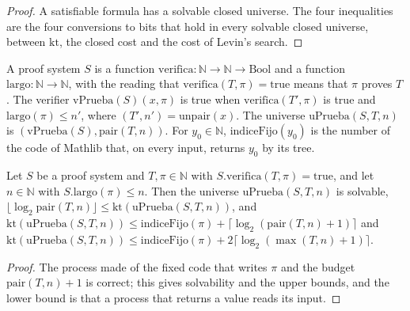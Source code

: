 \begin{proof}
  \leanok
  A satisfiable formula has a solvable closed universe. The four inequalities are the four
  conversions to bits that hold in every solvable closed universe, between $\mathrm{kt}$, the closed
  cost and the cost of Levin's search.
\end{proof}

\begin{definition}
  \label{def:information-proof-system}
  \leanok
  A proof system $S$ is a function $\mathrm{verifica} : \mathbb{N} \to \mathbb{N} \to \mathrm{Bool}$
  and a function $\mathrm{largo} : \mathbb{N} \to \mathbb{N}$, with the reading that
  $\mathrm{verifica}(T, \pi) = \mathrm{true}$ means that $\pi$ proves $T$. The verifier
  $\mathrm{vPrueba}(S)(x, \pi)$ is true when $\mathrm{verifica}(T', \pi)$ is true and
  $\mathrm{largo}(\pi) \le n'$, where $(T', n') = \mathrm{unpair}(x)$. The universe
  $\mathrm{uPrueba}(S, T, n)$ is $(\mathrm{vPrueba}(S), \mathrm{pair}(T, n))$. For $y_0 \in
  \mathbb{N}$, $\mathrm{indiceFijo}(y_0)$ is the number of the code of Mathlib that, on every input,
  returns $y_0$ by its tree.
  \own{}
\end{definition}

\begin{theorem}
  \label{thm:information-fixed-theorem}
  \leanok
  Let $S$ be a proof system and $T, \pi \in \mathbb{N}$ with $S.\mathrm{verifica}(T, \pi) =
  \mathrm{true}$, and let $n \in \mathbb{N}$ with $S.\mathrm{largo}(\pi) \le n$. Then the universe
  $\mathrm{uPrueba}(S, T, n)$ is solvable, $\lfloor \log_2 \mathrm{pair}(T, n) \rfloor \le
  \mathrm{kt}(\mathrm{uPrueba}(S, T, n))$, and $\mathrm{kt}(\mathrm{uPrueba}(S, T, n)) \le
  \mathrm{indiceFijo}(\pi) + \lceil \log_2 (\mathrm{pair}(T, n) + 1) \rceil$ and
  $\mathrm{kt}(\mathrm{uPrueba}(S, T, n)) \le \mathrm{indiceFijo}(\pi) + 2 \lceil \log_2 (\max(T, n) + 1) \rceil$.
  \own{}
\end{theorem}

\begin{proof}
  \leanok
  The process made of the fixed code that writes $\pi$ and the budget $\mathrm{pair}(T, n) + 1$ is
  correct; this gives solvability and the upper bounds, and the lower bound is that a process that
  returns a value reads its input.
\end{proof}

